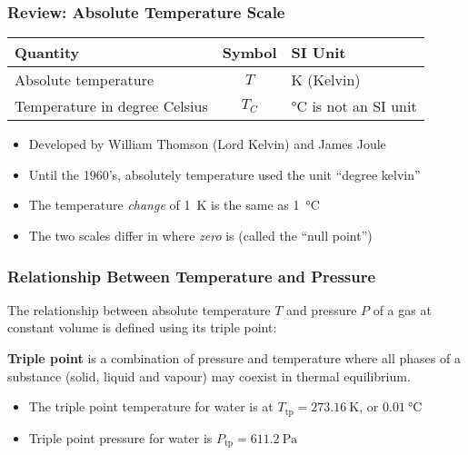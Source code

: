 \documentclass[12pt,aspectratio=169]{beamer}
\newcommand{\eq}[2]{\vspace{#1}{\Large\begin{displaymath}#2\end{displaymath}}}
\begin{document}
\begin{frame}
  \frametitle{Review: Absolute Temperature Scale}
  \eq{.01in}{
    \boxed{T = T_C + 273.15}
  }
  \begin{center}
    \begin{tabular}{l|c|l}
      \rowcolor{pink}
      \textbf{Quantity}     & \textbf{Symbol} & \textbf{SI Unit} \\ \hline
      Absolute temperature  & $T$            & \si{\kelvin} (Kelvin) \\
      Temperature in degree Celsius & $T_C$  & \si{\celsius} is not an SI unit
    \end{tabular}
  \end{center}
  \begin{itemize}
  \item Developed by William Thomson (Lord Kelvin) and James Joule
  \item Until the 1960's, absolutely temperature used the unit ``degree kelvin''
  \item The temperature \emph{change} of \SI{1}{\kelvin} is the same as
    \SI{1}{\celsius}
  \item The two scales differ in where \emph{zero} is (called the
    ``null point'')
  \end{itemize}
\end{frame}
  

\begin{frame}
  \frametitle{Relationship Between Temperature and Pressure}
  The relationship between absolute temperature $T$ and pressure $P$
  of a gas at constant volume is defined using its triple point:

  \eq{-.1in}{
    T=\frac{T_\mathrm{tp}}{P_\mathrm{tp}}P
  }

  \textbf{Triple point} is a combination of pressure and temperature where all
  phases of a substance (solid, liquid and vapour) may coexist in thermal
  equilibrium.
  \begin{itemize}
  \item The triple point temperature for water is at
    $T_\mathrm{tp}=\SI{273.16}{\kelvin}$, or $\SI{0.01}{\celsius}$
  \item Triple point pressure for water is $P_\mathrm{tp}=\SI{611.2}{\pascal}$
  \end{itemize}
\end{frame}
\end{document}
